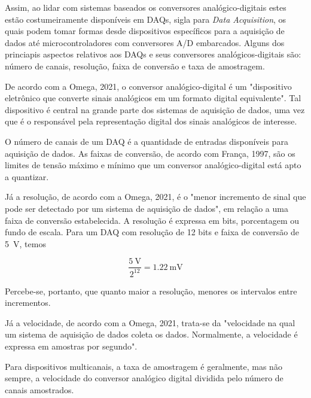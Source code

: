 \documentclass[
	12pt,				
	oneside,			
	a4paper,			
	english,			
	brazil,	
	sumario=abnt-6027-2012		
	]{abntex2ppgsi}
\begin{document}
Assim, ao lidar com sistemas baseados os conversores analógico-digitais estes estão costumeiramente disponíveis em DAQs, sigla para \textit{Data Acquisition}, os quais podem tomar formas desde dispositivos específicos para a aquisição de dados até microcontroladores com conversores A/D embarcados. Alguns dos princiapis aspectos relativos aos DAQs e seus conversores analógicos-digitais são: número de canais, resolução, faixa de conversão e taxa de amostragem.

De acordo com a Omega, 2021, o conversor analógico-digital é um "dispositivo eletrônico que converte sinais analógicos em um formato digital equivalente". Tal dispositivo é central na grande parte dos sistemas de aquisição de dados, uma vez que é o responsável pela representação digital dos sinais analógicos de interesse. 


O número de canais de um DAQ é a quantidade de entradas disponíveis para aquisição de dados. As faixas de conversão, de acordo com França, 1997, são os limites de tensão máximo e mínimo que um conversor analógico-digital está apto a quantizar.

Já a resolução, de acordo com a Omega, 2021, é o "menor incremento de sinal que pode ser detectado por um sistema de aquisição de dados", em relação a uma faixa de conversão estabelecida. A resolução é expressa em bits, porcentagem ou fundo de escala. Para um DAQ com resolução de 12 bits e faixa de conversão de \SI{5}{\volt}, temos 

\begin{equation}
	\frac{\SI{5}{\volt}}{2^{12}} = \SI{1,22}{\milli\volt}
	\label{eq: Resolução de DAQ de 12 bits com faixa de conversão de 5 volts}
\end{equation}


Percebe-se, portanto, que quanto maior a resolução, menores os intervalos entre incrementos. 

Já a velocidade, de acordo com a Omega, 2021, trata-se da "velocidade na qual um sistema de aquisição de dados coleta os dados. Normalmente, a velocidade é expressa em amostras por segundo". 

Para dispositivos multicanais, a taxa de amostragem é geralmente, mas não sempre, a velocidade do conversor analógico digital dividida pelo número de canais amostrados. 
\end{document}
